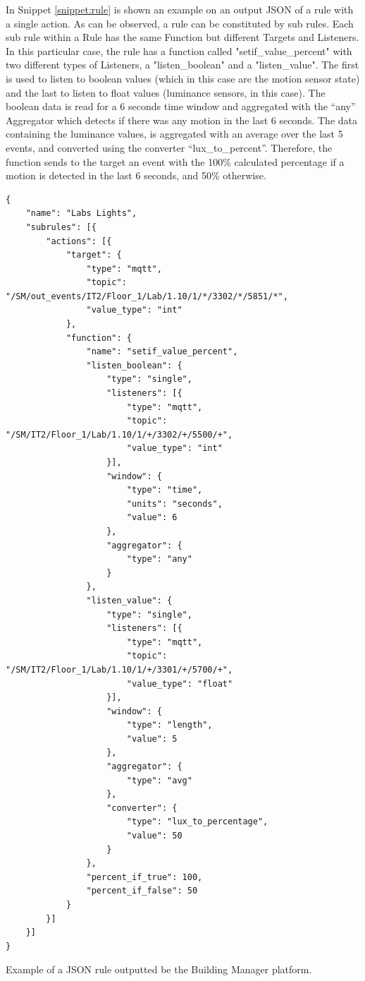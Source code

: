 In Snippet \ref{snippet:rule} is shown an example on an output JSON of a rule with a single action. As can be observed, a rule can be constituted by sub rules. Each sub rule within a Rule has the same Function but different Targets and Listeners. In this particular case, the rule has a function called "setif\_value\_percent" with two different types of Listeners, a "listen\_boolean" and a "listen\_value". The first is used to listen to boolean values (which in this case are the motion sensor state) and the last to listen to float values (luminance sensors, in this case). The boolean data is read for a 6 seconds time window and aggregated with the “any” Aggregator which detects if there was any motion in the last 6 seconds. The data containing the luminance values, is aggregated with an average over the last 5 events, and converted using the converter “lux\_to\_percent”. Therefore, the function sends to the target an event with the 100\% calculated percentage if a motion is detected in the last 6 seconds, and 50\% otherwise. 


\begin{listing}[H]
	\begin{verbatim}
{
    "name": "Labs Lights",
    "subrules": [{
        "actions": [{
            "target": {
                "type": "mqtt",
                "topic": "/SM/out_events/IT2/Floor_1/Lab/1.10/1/*/3302/*/5851/*",
                "value_type": "int"
            },
            "function": {
                "name": "setif_value_percent",
                "listen_boolean": {
                    "type": "single",
                    "listeners": [{
                        "type": "mqtt",
                        "topic": "/SM/IT2/Floor_1/Lab/1.10/1/+/3302/+/5500/+",
                        "value_type": "int"
                    }],
                    "window": {
                        "type": "time",
                        "units": "seconds",
                        "value": 6
                    },
                    "aggregator": {
                        "type": "any"
                    }
                },
                "listen_value": {
                    "type": "single",
                    "listeners": [{
                        "type": "mqtt",
                        "topic": "/SM/IT2/Floor_1/Lab/1.10/1/+/3301/+/5700/+",
                        "value_type": "float"
                    }],
                    "window": {
                        "type": "length",
                        "value": 5
                    },
                    "aggregator": {
                        "type": "avg"
                    },
                    "converter": {
                        "type": "lux_to_percentage",
                        "value": 50
                    }
                },
                "percent_if_true": 100,
                "percent_if_false": 50
            }
        }]
    }]
}
	\end{verbatim}
	\caption{Example of a JSON rule outputted be the Building Manager platform.}
	\label{snippet:rule}
\end{listing}




